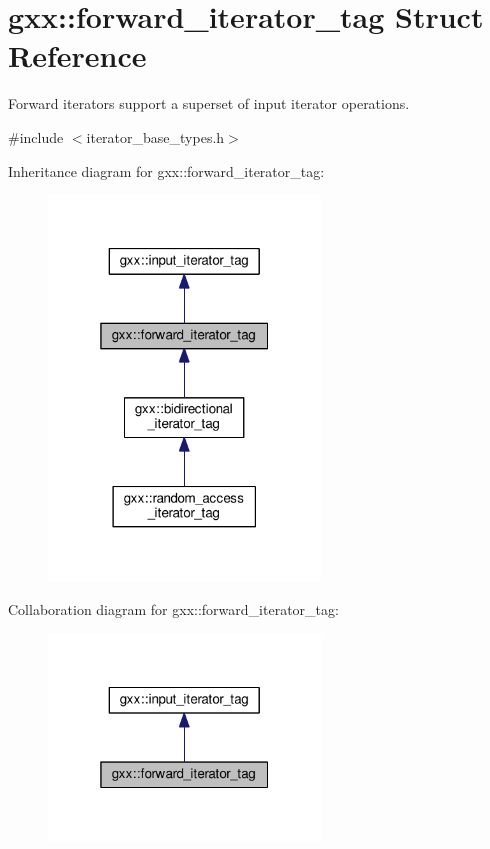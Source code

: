\hypertarget{structgxx_1_1forward__iterator__tag}{}\section{gxx\+:\+:forward\+\_\+iterator\+\_\+tag Struct Reference}
\label{structgxx_1_1forward__iterator__tag}


Forward iterators support a superset of input iterator operations.  




{\ttfamily \#include $<$iterator\+\_\+base\+\_\+types.\+h$>$}



Inheritance diagram for gxx\+:\+:forward\+\_\+iterator\+\_\+tag\+:
\nopagebreak
\begin{figure}[H]
\begin{center}
\leavevmode
\includegraphics[width=205pt]{structgxx_1_1forward__iterator__tag__inherit__graph}
\end{center}
\end{figure}


Collaboration diagram for gxx\+:\+:forward\+\_\+iterator\+\_\+tag\+:
\nopagebreak
\begin{figure}[H]
\begin{center}
\leavevmode
\includegraphics[width=205pt]{structgxx_1_1forward__iterator__tag__coll__graph}
\end{center}
\end{figure}


